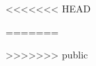 \documentclass[8pt]{book}
\begin{document}
\pagestyle{plain}


%
%
%
%
%
%
%
<<<<<<< HEAD
%

%
%
=======

%
>>>>>>> public
%
%
%
%
%
%
%
%
%
%
%
%
%
%
%
%
%



\afterpage{\clearpage}
\end{document}
